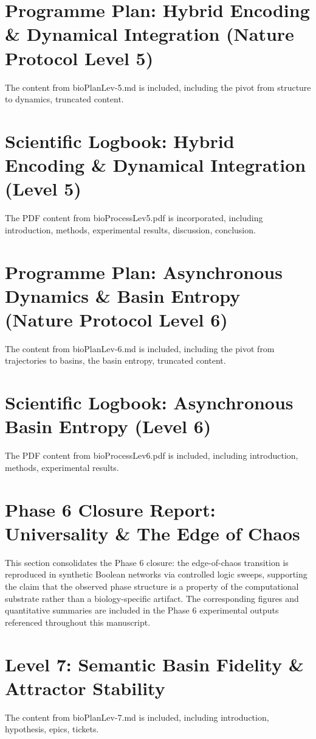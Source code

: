 \documentclass{article}
\begin{document}
\section{Programme Plan: Hybrid Encoding \& Dynamical Integration (Nature Protocol Level 5)}
The content from bioPlanLev-5.md is included, including the pivot from structure to dynamics, truncated content.

\section{Scientific Logbook: Hybrid Encoding \& Dynamical Integration (Level 5)}
The PDF content from bioProcessLev5.pdf is incorporated, including introduction, methods, experimental results, discussion, conclusion.

\section{Programme Plan: Asynchronous Dynamics \& Basin Entropy (Nature Protocol Level 6)}
The content from bioPlanLev-6.md is included, including the pivot from trajectories to basins, the basin entropy, truncated content.

\section{Scientific Logbook: Asynchronous Basin Entropy (Level 6)}
The PDF content from bioProcessLev6.pdf is included, including introduction, methods, experimental results.

\section{Phase 6 Closure Report: Universality \& The Edge of Chaos}
This section consolidates the Phase 6 closure: the edge-of-chaos transition is reproduced in synthetic Boolean networks via controlled logic sweeps, supporting the claim that the observed phase structure is a property of the computational substrate rather than a biology-specific artifact. The corresponding figures and quantitative summaries are included in the Phase 6 experimental outputs referenced throughout this manuscript.

\section{Level 7: Semantic Basin Fidelity \& Attractor Stability}
The content from bioPlanLev-7.md is included, including introduction, hypothesis, epics, tickets.
\end{document}
